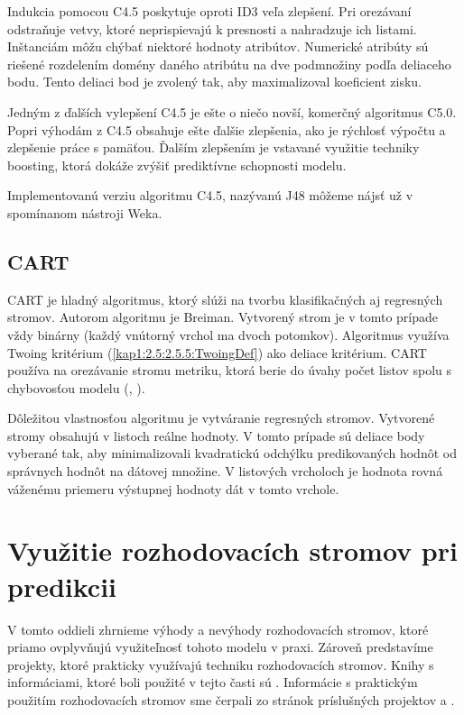Indukcia pomocou C4.5 poskytuje oproti ID3 veľa zlepšení. Pri orezávaní odstraňuje vetvy, ktoré neprispievajú k presnosti a nahradzuje ich listami. Inštanciám môžu chýbať niektoré hodnoty atribútov. Numerické atribúty sú riešené rozdelením domény daného atribútu na dve podmnožiny podľa deliaceho bodu. Tento deliaci bod je zvolený tak, aby maximalizoval koeficient zisku.

Jedným z ďalších vylepšení C4.5 je ešte o niečo novší, komerčný algoritmus C5.0. Popri výhodám z C4.5 obsahuje ešte ďalšie zlepšenia, ako je rýchlosť výpočtu a zlepšenie práce s pamäťou. Ďalším zlepšením je vstavané využitie techniky boosting, ktorá dokáže zvýšiť prediktívne schopnosti modelu.

Implementovanú verziu algoritmu C4.5, nazývanú J48 môžeme nájsť už v spomínanom nástroji Weka.

\subsection{CART}\label{kap1:2.7:2.7.5:CART}
CART je hladný algoritmus, ktorý slúži na tvorbu klasifikačných aj regresných stromov. Autorom algoritmu je Breiman. Vytvorený strom je v tomto prípade vždy binárny (každý vnútorný vrchol ma dvoch potomkov). Algoritmus využíva Twoing kritérium (\ref{kap1:2.5:2.5.5:TwoingDef}) ako deliace kritérium. CART používa na orezávanie stromu metriku, ktorá berie do úvahy počet listov spolu s chybovosťou modelu (\cite{wiki-costcompprune}, \cite[s.382]{kap1-DecisionTree}).

Dôležitou vlastnosťou algoritmu je vytváranie regresných stromov. Vytvorené stromy obsahujú v listoch reálne hodnoty. V tomto prípade sú deliace body vyberané tak, aby minimalizovali kvadratickú odchýlku predikovaných hodnôt od správnych hodnôt na dátovej množine. V listových vrcholoch je hodnota rovná váženému priemeru výstupnej hodnoty dát v tomto vrchole.

\section{Využitie rozhodovacích stromov pri predikcii}\label{kap1:2.8:DTUsage}
V tomto oddieli zhrnieme výhody a nevýhody rozhodovacích stromov, ktoré priamo ovplyvňujú využiteľnosť tohoto modelu v praxi. Zároveň predstavíme projekty, ktoré prakticky využívajú techniku rozhodovacích stromov. Knihy s informáciami, ktoré boli použité v tejto časti sú \cite{kap1-DataMiningAndAnalysis,kap1-DataMiningForTrees}. Informácie s praktickým použitím rozhodovacích stromov sme čerpali zo stránok príslušných projektov \cite{online-astronomy} a \cite{online-psychoterapy}.

